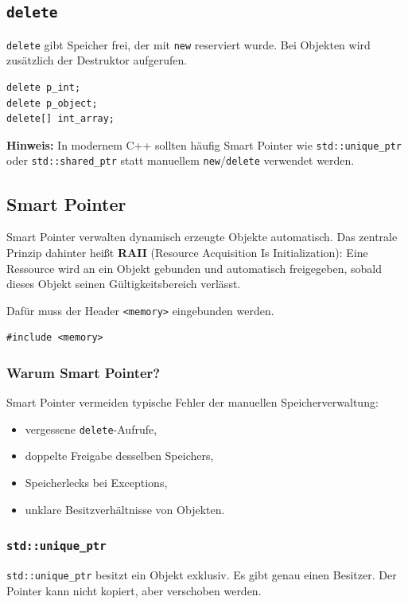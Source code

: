 \documentclass[11pt,a4paper]{article}
\newcommand{\code}[1]{\texttt{#1}}
\newcommand{\important}[1]{\textbf{#1}}
\begin{document}
\subsection{\code{delete}}
\code{delete} gibt Speicher frei, der mit \code{new} reserviert wurde. Bei Objekten wird zusätzlich der Destruktor aufgerufen.

\begin{lstlisting}[caption={Speicher freigeben}]
delete p_int;
delete p_object;
delete[] int_array;
\end{lstlisting}

\important{Hinweis:} In modernem C++ sollten häufig Smart Pointer wie \code{std::unique\_ptr} oder \code{std::shared\_ptr} statt manuellem \code{new}/\code{delete} verwendet werden.

\subsection{Smart Pointer}
Smart Pointer verwalten dynamisch erzeugte Objekte automatisch. Das zentrale Prinzip dahinter heißt \important{RAII} (Resource Acquisition Is Initialization): Eine Ressource wird an ein Objekt gebunden und automatisch freigegeben, sobald dieses Objekt seinen Gültigkeitsbereich verlässt.

Dafür muss der Header \code{<memory>} eingebunden werden.

\begin{lstlisting}[caption={Header für Smart Pointer}]
#include <memory>
\end{lstlisting}

\subsubsection{Warum Smart Pointer?}
Smart Pointer vermeiden typische Fehler der manuellen Speicherverwaltung:
\begin{itemize}
  \item vergessene \code{delete}-Aufrufe,
  \item doppelte Freigabe desselben Speichers,
  \item Speicherlecks bei Exceptions,
  \item unklare Besitzverhältnisse von Objekten.
\end{itemize}

\subsubsection{\code{std::unique\_ptr}}
\code{std::unique\_ptr} besitzt ein Objekt exklusiv. Es gibt genau einen Besitzer. Der Pointer kann nicht kopiert, aber verschoben werden.
\end{document}
